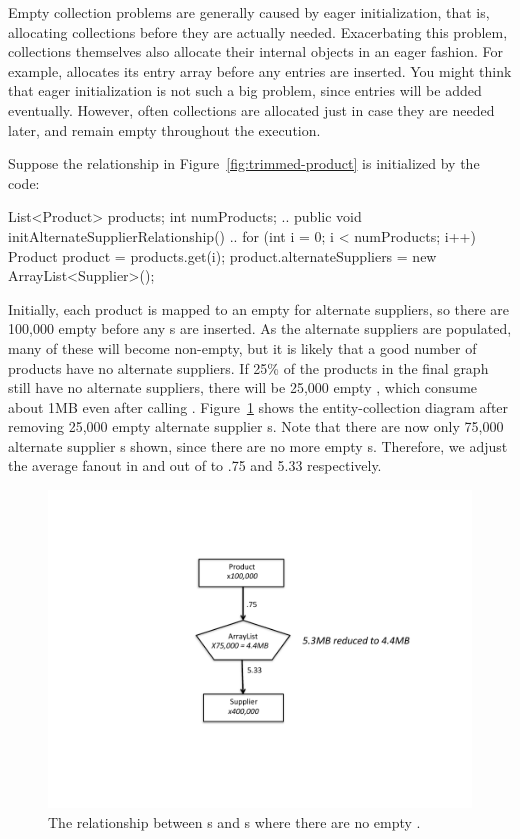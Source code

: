 Empty collection problems are generally caused by eager initialization, that is,
allocating collections before they are actually needed. Exacerbating this
problem, collections themselves also allocate their internal objects in an eager
fashion. For example,  allocates its entry array before any entries are inserted.
You might think that eager initialization is not such a big problem, since
entries will be added eventually. However, often collections are allocated
just in case they are needed later, and remain empty throughout the execution.

Suppose the relationship
in Figure~\ref{fig:trimmed-product} is initialized by the code:
\begin{shortlisting}
List<Product> products;
int numProducts;
   ..
   public void initAlternateSupplierRelationship() {
       ..
       for (int i = 0; i < numProducts; i++) {
          Product product = products.get(i);
          product.alternateSuppliers = 
                           new ArrayList<Supplier>();
       }
   }
\end{shortlisting}
Initially, each product is mapped to an empty  for alternate
suppliers, so there are 100,000 empty  before any
s are inserted. As the alternate suppliers are populated, many
of these  will become non-empty, but it is likely that a good
number of products have no alternate suppliers. If 25\% of the products in the
final graph still have no alternate suppliers, there will be 25,000 empty
, which consume about 1MB even after calling
.
Figure~\ref{fig:empty-array} shows the entity-collection
diagram after removing 25,000 empty alternate supplier s. Note
that there are now only 75,000 alternate supplier s shown,
since there are no more empty s. Therefore, we adjust the
average fanout in and out of  to .75 and
5.33 respectively.
\begin{figure}
  \centering
 \includegraphics[width=.80\textwidth]{part1/Figures/collections/empty-product.pdf}
 \caption{The relationship between s and s
  where there are no empty .}
  \label{fig:empty-array}
\end{figure}
 
